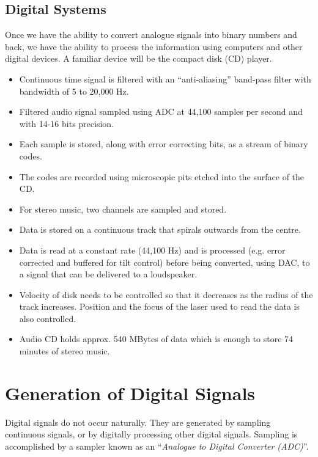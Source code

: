 \subsection*{Digital Systems}

Once we have the ability to convert analogue signals into binary
numbers and back, we have the ability to process the information using
computers and other digital devices. A familiar device will be the
compact disk (CD) player.

\begin{slide}\label{slide:CD1}
\begin{itemize}
\item Continuous time signal is filtered with an ``anti-aliasing''
  band-pass filter with bandwidth of 5 to 20,000 Hz.
\item Filtered audio signal sampled using ADC at 44,100 samples per second and
  with 14-16 bits precision. 
\item Each sample is stored, along with error
  correcting bits, as a stream of binary codes. 
\item The codes are recorded using microscopic pits etched into the surface of the CD.
\end{itemize}
\end{slide}

\begin{slide}\label{slide:CD2}
\begin{itemize}
\item For stereo music, two channels are sampled and stored.
\item Data is stored on a continuous track that spirals outwards from
  the centre.
\item Data is read at a constant rate (44,100 Hz) and is processed (e.g.
  error corrected and buffered for tilt control) before being
  converted, using DAC, to a signal that can be delivered to a
  loudspeaker.
\item Velocity of disk needs to be controlled so that it decreases as
  the radius of the track increases. Position and the focus of the laser used to read the data is
  also controlled.
\item Audio CD holds approx. 540 MBytes of data which is enough to
  store 74 minutes of stereo music.
\end{itemize}
\end{slide}


\section*{Generation of Digital Signals}
Digital signals do not occur naturally. They are generated by
sampling continuous signals, or by digitally processing other
digital signals. Sampling is accomplished by a sampler known as an
``\emph{Analogue to Digital Converter (ADC)}''.

